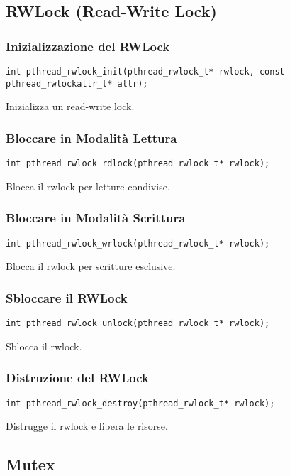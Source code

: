 \documentclass{article}
\begin{document}
\subsection{RWLock (Read-Write Lock)}

\subsubsection{Inizializzazione del RWLock}
\begin{verbatim}
int pthread_rwlock_init(pthread_rwlock_t* rwlock, const pthread_rwlockattr_t* attr);
\end{verbatim}
Inizializza un read-write lock.

\subsubsection{Bloccare in Modalità Lettura}
\begin{verbatim}
int pthread_rwlock_rdlock(pthread_rwlock_t* rwlock);
\end{verbatim}
Blocca il rwlock per letture condivise.

\subsubsection{Bloccare in Modalità Scrittura}
\begin{verbatim}
int pthread_rwlock_wrlock(pthread_rwlock_t* rwlock);
\end{verbatim}
Blocca il rwlock per scritture esclusive.

\subsubsection{Sbloccare il RWLock}
\begin{verbatim}
int pthread_rwlock_unlock(pthread_rwlock_t* rwlock);
\end{verbatim}
Sblocca il rwlock.

\subsubsection{Distruzione del RWLock}
\begin{verbatim}
int pthread_rwlock_destroy(pthread_rwlock_t* rwlock);
\end{verbatim}
Distrugge il rwlock e libera le risorse.

\subsection{Mutex}
\end{document}
